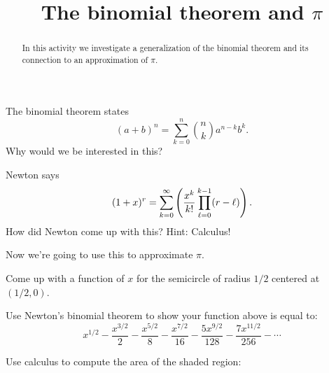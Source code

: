 \documentclass{ximera}
\title{The binomial theorem and $\pi$}
\begin{document}
\begin{abstract}
In this activity we investigate a generalization of the binomial theorem and its connection to an approximation of $\pi$.
\end{abstract}
\maketitle


\begin{question}
The binomial theorem states
\[
(a+b)^n = \sum_{k=0}^n \binom{n}{k} a^{n-k}b^k.
\]
Why would we be interested in this? 
\end{question}

\begin{question}
Newton says
\[
(1+x)^r = \sum_{k=0}^\infty \left(\frac{x^k}{k!} \prod_{\ell = 0}^{k-1}(r-\ell)\right).
\]
How did Newton come up with this? Hint: Calculus!
\end{question}

Now we're going to use this to approximate $\pi$.

\begin{question}
Come up with a function of $x$ for the semicircle of radius $1/2$ centered at $(1/2,0)$. 
\end{question}

\begin{question}
Use Newton's binomial theorem to show your function above is equal to: 
\[
x^{1/2} - \frac{x^{3/2}}{2} - \frac{x^{5/2}}{8} - \frac{x^{7/2}}{16}   - \frac{5x^{9/2}}{128}  - \frac{7x^{11/2}}{256} - \cdots
\]
\end{question}

\begin{question}
Use calculus to compute the area of the shaded region:
\begin{image}
\end{image}
\end{question}
\end{document}
